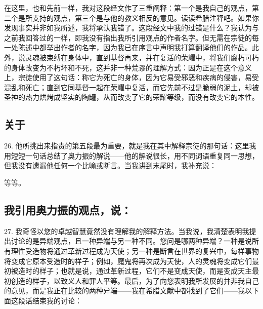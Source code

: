 在这里，也和先前一样，我对这段经文作了三重阐释：第一个是我自己的观点，第二个是所支持的观点，第三个是与他的教义相反的意见。读读希腊注释吧。如果你发现事实并非如我所述，我将承认我错了。这段经文中我的过错是什么？我认为与之前我回答过的一样，即我没有指出我所引用观点的作者名字。但无需在宗徒的每一处陈述中都举出作者的名字，因为我已在序言中声明我打算翻译他们的作品。此外，说灵魂被束缚在身体中，直到基督再来，并在复活的荣耀中，将我们腐朽可朽的身体改变为不朽坏和不死，这并非一种荒谬的理解方式：因为正是在这个意义上，宗徒使用了这句话：称它为死亡的身体，因为它易受邪恶和疾病的侵害，易受混乱和死亡；直到它同基督一起在荣耀中复活，而它先前不过是脆弱的泥土，却被圣神的热力烘烤成坚实的陶罐，从而改变了它的荣耀等级，而没有改变它的本性。\par


\subsection{关于}

26. 他所挑出来指责的第五段最为重要，就是我在其中解释宗徒的那句话：这里我用短短一句话总结了奥力振的解说——他的解说很长，用不同词语重复同一思想，但我没有遗漏他任何一个比喻或断言。当我讲到末尾时，我补充说：\par

等等。\par


\subsection{我引用奥力振的观点，说：}

27. 我奇怪以您的卓越智慧竟然没有理解我的解释方法。当我说，我清楚表明我提出讨论的是异端观点，且一种异端与另一种不同。您问是哪两种异端？一种是说所有理性受造物将通过革新过程成为天使；另一种是断言在世界的复兴中，每样事物将变成它原本受造时的样子；例如，魔鬼将再次成为天使，人的灵魂将变成它们最初被造时的样子；也就是说，通过革新过程，它们不是变成天使，而是变成天主最初创造的样子，以致义人和罪人平等。最后，为了向您表明我所发展的并非我自己的意见，而是我正在比较的两种异端——我在希腊文献中都找到了它们——我以下面这段话结束我的讨论：\par

